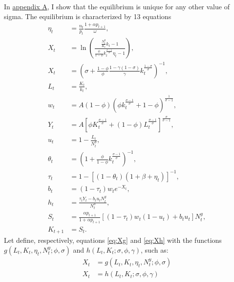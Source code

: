 In \hyperref[appendix:uniqueness]{appendix A}, I show that the equilibrium is unique for any other value of sigma. The equilibrium is characterized by 13 equations
	\begin{align}
		\eta_t &= \frac{n_t}{p_t}\frac{1+\alpha p_{t+1}}{\omega}, \tag{Pub. $\eta$} \\
		X_t &= \ln\left( \frac{ \frac{N_t^y}{K_t} k_t - 1 } { \frac{\phi}{1-\phi} k_t^{\frac{\sigma-1}{\sigma}} \eta_t - 1 }\right), \tag{Eq. $g$} \\
		X_t &= \left( \sigma + \frac{1-\phi}{\phi} \frac{1-\gamma(1-\sigma)}{\gamma} k_t^{\frac{1-\sigma}{\sigma}} \right)^{-1}, \tag{Eq. h}\\
		L_t &= \frac{K_t}{k_t}, \tag{Prod. $L$} \\
		w_t &= A(1-\phi)\left( \phi k_t^\frac{\sigma-1}{\sigma} + 1-\phi \right)^\frac{1}{\sigma-1}, \tag{Prod. $w$}\\
		Y_t &= A \left[ \phi K_t^\frac{\sigma-1}{\sigma} + (1-\phi) L_t^\frac{\sigma-1}{\sigma} \right]^\frac{\sigma}{\sigma-1}, \tag{Prod. $Y$}\\
		u_t &= 1 - \frac{L_t}{N_t^y}, \tag{Prod. $u$}\\
		\theta_t &= \left(1 + \frac{\phi}{1-\phi} k_t^\frac{\sigma-1}{\sigma} \right)^{-1}, \tag{Prod. $\theta$} \\
		\tau_t &= 1 - \left[ (1-\theta_t)(1+\beta+\eta_t) \right]^{-1}, \tag{Pub. $\tau$}\\
		b_t &= (1-\tau_t) w_t e^{-X_t}, \tag{Pub. $b$}\\
		h_t &= \frac{\tau_t Y_t - b_t u_t N_t^y}{N_t^o}, \tag{Pub. $h$}\\
		S_t &= \frac{\alpha p_{t+1}}{1 + \alpha p_{t+1}} \left[ (1-\tau_t)w_t(1-u_t) + b_tu_t \right] N_t^y, \tag{HH. $S$}  \\
		K_{t+1} &= S_t.	\tag{HH. $K$}
	\end{align}
Let define, respectively, equations \eqref{eq:Xg} and \eqref{eq:Xh} with the functions $g(L_t, K_t, \eta_t, N_t^y; \phi, \sigma)$ and $h(L_t, K_t; \sigma, \phi, \gamma)$, such as:
	\begin{align*}
		X_t &= g(L_t, K_t, \eta_t, N_t^y; \phi, \sigma) 
		\\
		X_t &= h(L_t, K_t; \sigma, \phi, \gamma) 
	\end{align*}
